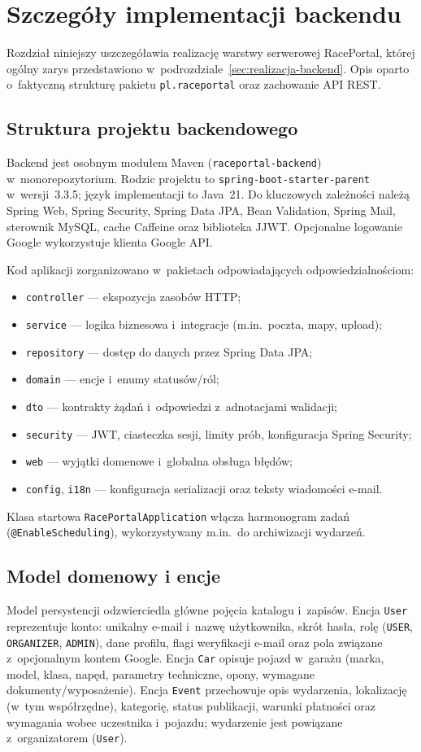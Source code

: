 \documentclass{sprz}
\begin{document}
\chapter{Szczegóły implementacji backendu}
\label{ch:backend}
Rozdział niniejszy uszczegóławia realizację warstwy serwerowej RacePortal, której ogólny zarys przedstawiono w~podrozdziale~\ref{sec:realizacja-backend}. Opis oparto o~faktyczną strukturę pakietu \texttt{pl.raceportal} oraz zachowanie API REST.

\section{Struktura projektu backendowego}
Backend jest osobnym modułem Maven (\texttt{raceportal-backend}) w~monorepozytorium. Rodzic projektu to \texttt{spring-boot-starter-parent} w~wersji~3.3.5; język implementacji to Java~21. Do kluczowych zależności należą Spring Web, Spring Security, Spring Data JPA, Bean Validation, Spring Mail, sterownik MySQL, cache Caffeine oraz biblioteka JJWT. Opcjonalne logowanie Google wykorzystuje klienta Google API.

Kod aplikacji zorganizowano w~pakietach odpowiadających odpowiedzialnościom:
\begin{itemize}
  \item \texttt{controller} --- ekspozycja zasobów HTTP;
  \item \texttt{service} --- logika biznesowa i~integracje (m.in.\ poczta, mapy, upload);
  \item \texttt{repository} --- dostęp do danych przez Spring Data JPA;
  \item \texttt{domain} --- encje i~enumy statusów/ról;
  \item \texttt{dto} --- kontrakty żądań i~odpowiedzi z~adnotacjami walidacji;
  \item \texttt{security} --- JWT, ciasteczka sesji, limity prób, konfiguracja Spring Security;
  \item \texttt{web} --- wyjątki domenowe i~globalna obsługa błędów;
  \item \texttt{config}, \texttt{i18n} --- konfiguracja serializacji oraz teksty wiadomości e-mail.
\end{itemize}
Klasa startowa \texttt{RacePortalApplication} włącza harmonogram zadań (\texttt{@EnableScheduling}), wykorzystywany m.in.\ do archiwizacji wydarzeń.

\section{Model domenowy i encje}
Model persystencji odzwierciedla główne pojęcia katalogu i~zapisów. Encja \texttt{User} reprezentuje konto: unikalny e-mail i~nazwę użytkownika, skrót hasła, rolę (\texttt{USER}, \texttt{ORGANIZER}, \texttt{ADMIN}), dane profilu, flagi weryfikacji e-mail oraz pola związane z~opcjonalnym kontem Google. Encja \texttt{Car} opisuje pojazd w~garażu (marka, model, klasa, napęd, parametry techniczne, opony, wymagane dokumenty/wyposażenie). Encja \texttt{Event} przechowuje opis wydarzenia, lokalizację (w~tym współrzędne), kategorię, status publikacji, warunki płatności oraz wymagania wobec uczestnika i~pojazdu; wydarzenie jest powiązane z~organizatorem (\texttt{User}).
\end{document}
